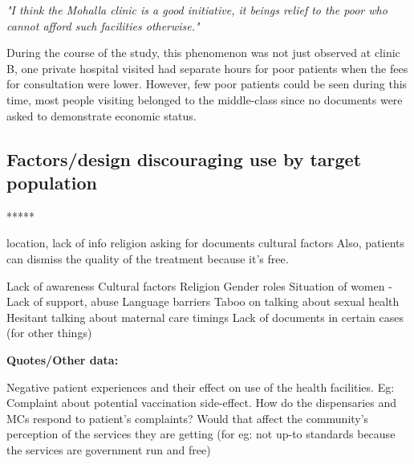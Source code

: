 \textit{"I think the Mohalla clinic is a good initiative, it beings relief to the poor who cannot afford such facilities otherwise."}

During the course of the study, this phenomenon was not just observed at clinic B, one private hospital visited had separate hours for poor patients when the fees for consultation were lower. However, few poor patients could be seen during this time, most people visiting belonged to the middle-class since no documents were asked to demonstrate economic status.
\subsection{Factors/design discouraging use by target population}

*****

location, lack of info
religion
asking for documents
cultural factors
Also, patients can dismiss the quality of the treatment because it’s free.

Lack of awareness
Cultural factors
Religion
Gender roles
Situation of women - Lack of support, abuse
Language barriers
Taboo on talking about sexual health
Hesitant talking about maternal care
timings
Lack of documents in certain cases (for other things)

\textbf{Quotes/Other data:}

Negative patient experiences and their effect on use of the health facilities. Eg: Complaint about potential vaccination side-effect. How do the dispensaries and MCs respond to patient's complaints? Would that affect the community's perception of the services they are getting (for eg: not up-to standards because the services are government run and free)

